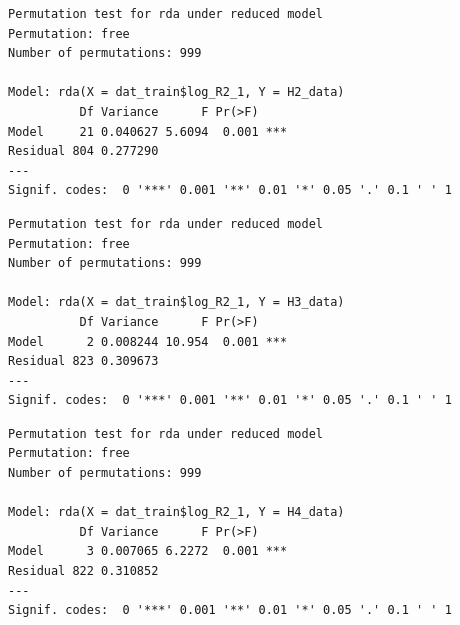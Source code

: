 \documentclass[
  letterpaper,
  DIV=11,
  numbers=noendperiod]{scrreprt}
\newenvironment{Shaded}{\begin{snugshade}}{\end{snugshade}}
\newcommand{\CommentTok}[1]{\textcolor[rgb]{0.37,0.37,0.37}{#1}}
\newcommand{\FunctionTok}[1]{\textcolor[rgb]{0.28,0.35,0.67}{#1}}
\newcommand{\NormalTok}[1]{\textcolor[rgb]{0.00,0.23,0.31}{#1}}
\newcommand{\SpecialCharTok}[1]{\textcolor[rgb]{0.37,0.37,0.37}{#1}}
\begin{document}
\begin{Shaded}
\end{Shaded}

\begin{verbatim}
Permutation test for rda under reduced model
Permutation: free
Number of permutations: 999

Model: rda(X = dat_train$log_R2_1, Y = H2_data)
          Df Variance      F Pr(>F)    
Model     21 0.040627 5.6094  0.001 ***
Residual 804 0.277290                  
---
Signif. codes:  0 '***' 0.001 '**' 0.01 '*' 0.05 '.' 0.1 ' ' 1
\end{verbatim}

\begin{Shaded}
\end{Shaded}

\begin{verbatim}
Permutation test for rda under reduced model
Permutation: free
Number of permutations: 999

Model: rda(X = dat_train$log_R2_1, Y = H3_data)
          Df Variance      F Pr(>F)    
Model      2 0.008244 10.954  0.001 ***
Residual 823 0.309673                  
---
Signif. codes:  0 '***' 0.001 '**' 0.01 '*' 0.05 '.' 0.1 ' ' 1
\end{verbatim}

\begin{Shaded}
\end{Shaded}

\begin{verbatim}
Permutation test for rda under reduced model
Permutation: free
Number of permutations: 999

Model: rda(X = dat_train$log_R2_1, Y = H4_data)
          Df Variance      F Pr(>F)    
Model      3 0.007065 6.2272  0.001 ***
Residual 822 0.310852                  
---
Signif. codes:  0 '***' 0.001 '**' 0.01 '*' 0.05 '.' 0.1 ' ' 1
\end{verbatim}
\end{document}

